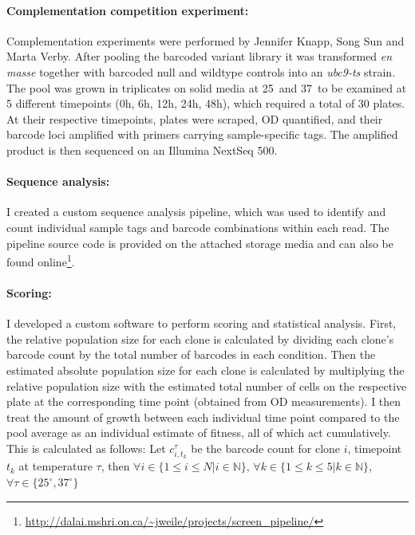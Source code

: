 \paragraph{Complementation competition experiment:} Complementation experiments were performed by Jennifer Knapp, Song Sun and Marta Verby. After pooling the barcoded  variant library it was transformed \textit{en masse} together with barcoded null and wildtype controls into an  \textit{ubc9-ts} strain. 
The pool was grown in triplicates on solid media at 25\celsius\ and 37\celsius\ to be examined at 5 different timepoints (0h, 6h, 12h, 24h, 48h), which required a total of 30 plates. At their respective timepoints, plates were scraped, OD quantified, and their barcode loci amplified with primers carrying sample-specific tags. The amplified product is then sequenced on an Illumina NextSeq 500.

\paragraph{Sequence analysis:} I created a custom sequence analysis pipeline, which was used to identify and count individual sample tags and barcode combinations within each read. The pipeline source code is provided on the attached storage media and can also be found online\footnote{\url{http://dalai.mshri.on.ca/~jweile/projects/screen_pipeline/}}.

\paragraph{Scoring:} I developed a custom software to perform scoring and statistical analysis. First, the relative population size for each clone is calculated by dividing each clone's barcode count by the total number of barcodes in each condition. Then the estimated absolute population size for each clone is calculated by multiplying the relative population size with the estimated total number of cells on the respective plate at the corresponding time point (obtained from OD measurements). I then treat the amount of growth between each individual time point compared to the pool average as an individual estimate of fitness, all of which act cumulatively. This is calculated as follows: Let $c_{i,t_k}^\tau$ be the barcode count for clone $i$, timepoint $t_k$ at temperature $\tau$, then $ \forall i \in \{1 \le i \le N | i \in \mathbb{N} \}$, 
$\forall k \in \{1 \le k \le 5 | k \in \mathbb{N} \}$, 
$\forall \tau \in \{25^{\circ},37^{\circ} \}$

